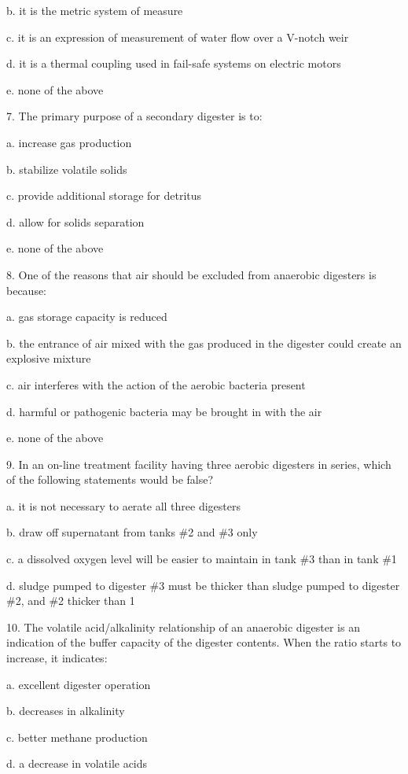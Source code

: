 \documentclass{article}
\begin{document}
b. it is the metric system of measure 

c. it is an expression of measurement of water flow over a V-notch weir 

d. it is a thermal coupling used in fail-safe systems on electric motors 

e. none of the above 


7. The primary purpose of a secondary digester is to: 

a. increase gas production 

b. stabilize volatile solids 

c. provide additional storage for detritus 

d. allow for solids separation 

e. none of the above 


8. One of the reasons that air should be excluded from anaerobic digesters is because: 

a. gas storage capacity is reduced 

b. the entrance of air mixed with the gas produced in the digester could create an explosive mixture 

c. air interferes with the action of the aerobic bacteria present 

d. harmful or pathogenic bacteria may be brought in with the air 

e. none of the above 


9. In an on-line treatment facility having three aerobic digesters in series, which of the following statements would be false? 

a. it is not necessary to aerate all three digesters 

b. draw off supernatant from tanks \#2 and \#3 only 

c. a dissolved oxygen level will be easier to maintain in tank \#3 than in tank \#1 

d. sludge pumped to digester \#3 must be thicker than sludge pumped to digester \#2, and \#2 thicker than 1 


10. The volatile acid/alkalinity relationship of an anaerobic digester is an indication of the buffer capacity of the digester contents. When the ratio starts to increase, it indicates: 

a. excellent digester operation 

b. decreases in alkalinity 

c. better methane production 

d. a decrease in volatile acids 
\end{document}
